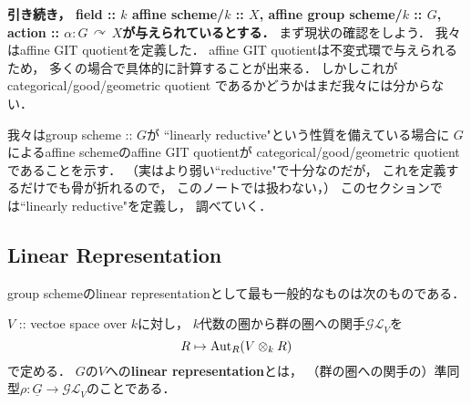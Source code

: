 \documentclass[a4paper]{jsarticle}
\newcommand{\Sch}{\mathbf{Sch}}
\newcommand{\func}[1]{\underline{#1}}
\newcommand{\ftorGL}{\mathcal{GL}}
\newcommand{\acton}{\,\curvearrowright\,}
\begin{document}
    \textbf
    {
    引き続き，
    field :: $k$
    affine scheme/$k$ :: $X$,
    affine group scheme/$k$ :: $G$,
    action :: $\alpha: G \acton X$が与えられているとする．
    }
    まず現状の確認をしよう．
    我々はaffine GIT quotientを定義した．
    affine GIT quotientは不変式環で与えられるため，
    多くの場合で具体的に計算することが出来る．
    しかしこれがcategorical/good/geometric quotient
    であるかどうかはまだ我々には分からない．
    
    我々はgroup scheme :: $G$が
    ``linearly reductive"という性質を備えている場合に
    $G$によるaffine schemeのaffine GIT quotientが
    categorical/good/geometric quotientであることを示す．
    （実はより弱い``reductive"で十分なのだが，
    これを定義するだけでも骨が折れるので，
    このノートでは扱わない，）
    このセクションでは``linearly reductive"を定義し，
    調べていく．

    \subsection{Linear Representation} 
    group schemeのlinear representationとして最も一般的なものは次のものである．
    \begin{Def}
        $V$ :: vectoe space over $k$に対し，
        $k$代数の圏から群の圏への関手$\ftorGL_V$を
        \[ R \mapsto \operatorname{Aut}_R(V \otimes_k R) \]
        で定める．
        $G$の$V$への\textbf{linear representation}とは，
        （群の圏への関手の）準同型$\rho: \func{G} \to \ftorGL_V$のことである．
    \end{Def}
\end{document}
